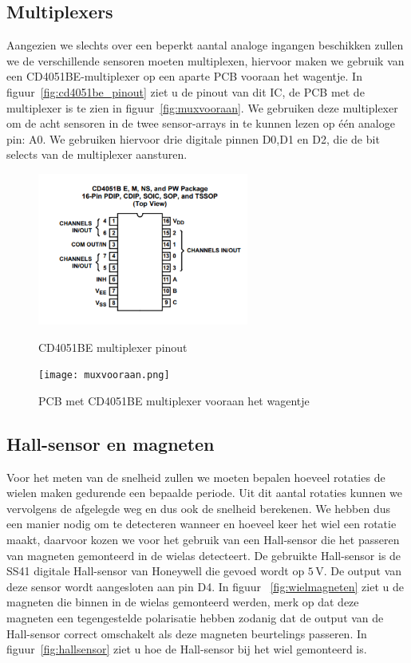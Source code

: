 \subsection{Multiplexers}
Aangezien we slechts over een beperkt aantal analoge ingangen beschikken zullen we de verschillende sensoren moeten multiplexen, hiervoor maken we gebruik van een CD4051BE-multiplexer op een aparte PCB vooraan het wagentje. In figuur~\vref{fig:cd4051be_pinout} ziet u de pinout van dit IC, de PCB met de multiplexer is te zien in figuur~\vref{fig:muxvooraan}. We gebruiken deze multiplexer om de acht sensoren in de twee sensor-arrays in te kunnen lezen op \'e\'en analoge pin: A0. We gebruiken hiervoor drie digitale pinnen D0,D1 en D2, die de bit selects van de multiplexer aansturen.

\begin{figure}[H]
	\centering
	\begin{minipage}[b]{0.4\textwidth}
		\includegraphics[height=5cm]{cd4051be_pinout.png}
		\caption{CD4051BE multiplexer pinout}
		\label{fig:cd4051be_pinout}
	\end{minipage}
	\hfill
	\begin{minipage}[b]{0.4\textwidth}
		\texttt{[image: muxvooraan.png]}
		\caption{PCB met CD4051BE multiplexer vooraan het wagentje}
		\label{fig:muxvooraan}
	\end{minipage}
\end{figure}
\subsection{Hall-sensor en magneten}\label{sec:hall-sensor}
Voor het meten van de snelheid zullen we moeten bepalen hoeveel rotaties de wielen maken gedurende een bepaalde periode. Uit dit aantal rotaties kunnen we vervolgens de afgelegde weg en dus ook de snelheid berekenen. We hebben dus een manier nodig om te detecteren wanneer en hoeveel keer het wiel een rotatie maakt, daarvoor kozen we voor het gebruik van een Hall-sensor die het passeren van magneten gemonteerd in de wielas detecteert. De gebruikte Hall-sensor is de SS41 digitale Hall-sensor van Honeywell die gevoed wordt op $5\,\mathrm{V}$. De output van deze sensor wordt aangesloten aan pin D4. In figuur ~\vref{fig:wielmagneten} ziet u de magneten die binnen in de wielas gemonteerd werden, merk op dat deze magneten een tegengestelde polarisatie hebben zodanig dat de output van de Hall-sensor correct omschakelt als deze magneten beurtelings passeren. In figuur~\vref{fig:hallsensor} ziet u hoe de Hall-sensor bij het wiel gemonteerd is.

